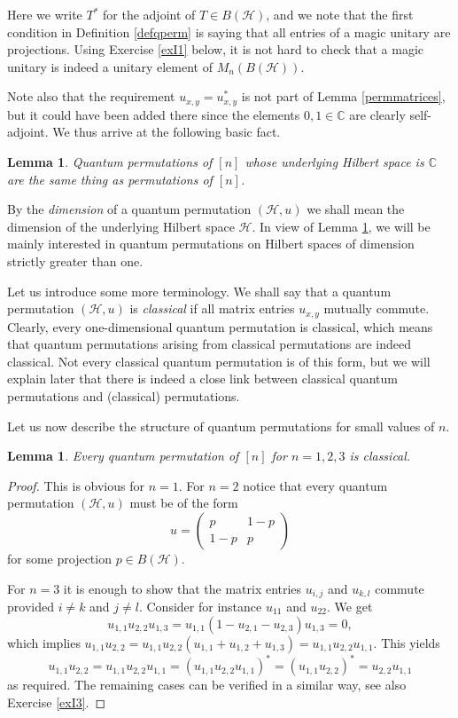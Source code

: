 \documentclass[a4paper]{amsart}
\newcommand*{\Hc}{\mathcal{H}}
\numberwithin{equation}{section}
\theoremstyle{change}
\newtheorem{lemma}[theorem]{Lemma}
\begin{document}
Here we write $ T^* $ for the adjoint of $ T \in B(\Hc) $, and we note that the first condition in 
Definition \ref{defqperm} is saying that all entries of a magic unitary are projections. Using Exercise \ref{exI1} below, it is not hard to check that a magic unitary is indeed a unitary element of $ M_n(B(\Hc)) $. 

Note also that the requirement $ u_{x,y} = u_{x,y}^* $ is not part of Lemma \ref{permmatrices}, but it could have been added there since the elements $ 0,1 \in \mathbb{C} $ are clearly self-adjoint. We thus arrive at the following basic fact. 

\begin{lemma} \label{qpermdimone}
Quantum permutations of $ [n] $ whose underlying Hilbert space is $ \mathbb{C} $ are the same thing as permutations of $ [n] $. 
\end{lemma} 

By the \emph{dimension} of a quantum permutation $ (\Hc,u) $ we shall mean the dimension of the underlying Hilbert space $ \Hc $. In view of Lemma \ref{qpermdimone}, 
we will be mainly interested in quantum permutations on Hilbert spaces of dimension strictly greater than one. 

Let us introduce some more terminology. We shall say that a quantum permutation $ (\Hc, u) $ is \emph{classical} if all matrix entries $ u_{x,y} $ mutually commute. 
Clearly, every one-dimensional quantum permutation is classical, which means that quantum permutations arising from classical permutations are indeed classical. 
Not every classical quantum permutation is of this form, but we will explain later that there is indeed a close link between classical quantum permutations 
and (classical) permutations. 

Let us now describe the structure of quantum permutations for small values of $ n $. 

\begin{lemma} \label{quantumpermutationssmalln}
Every quantum permutation of $ [n] $ for $ n = 1,2,3 $ is classical. 
\end{lemma} 

\begin{proof} 
This is obvious for $ n = 1 $. For $ n = 2 $ notice that every quantum permutation $ (\Hc, u) $ must be of the form 
$$
u =
\begin{pmatrix} 
p & 1 - p \\
1 - p & p 
\end{pmatrix} 
$$
for some projection $ p \in B(\Hc) $. 

For $ n = 3 $ it is enough to show that the matrix entries $ u_{i,j} $ and $ u_{k,l} $ commute provided $ i \neq k $ and $ j \neq l $. 
Consider for instance $ u_{11} $ and $ u_{22} $. We get 
$$
u_{1,1} u_{2,2} u_{1,3} = u_{1,1} (1 - u_{2,1} - u_{2,3}) u_{1,3} = 0,  
$$
which implies $ u_{1,1} u_{2,2} = u_{1,1} u_{2,2} (u_{1,1} + u_{1,2} + u_{1,3}) = u_{1,1} u_{2,2} u_{1,1} $. 
This yields 
$$
u_{1,1} u_{2,2} = u_{1,1} u_{2,2} u_{1,1} = (u_{1,1} u_{2,2} u_{1,1})^* = (u_{1,1} u_{2,2})^* = u_{2,2} u_{1,1} 
$$
as required. The remaining cases can be verified in a similar way, see also Exercise \ref{exI3}. 
\end{proof} 
\end{document}
